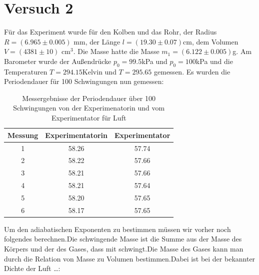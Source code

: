 \documentclass[bibliography=totocnumbered]{scrartcl}
\begin{document}
	\section{Versuch 2}
	Für das Experiment wurde für den Kolben und das Rohr, der Radius $ R=(6.965\pm 0.005) $ mm, der Länge $ l=(19.30\pm 0.07) $cm,
	 dem Volumen $ V=(4381\pm 10) $ cm$ ^{3} $.
	Die Masse hatte die Masse $ m_{1}=(6.122\pm0.005) $g.
	Am Barometer wurde der Außendrücke $ p_{0}=99.5 $kPa und $ p_{0}=100 $kPa  und die Temperaturen $ T=294.15 $Kelvin und $ T=295.65 $ gemessen.
	Es wurden die Periodendauer für 100 Schwingungen nun gemessen:
	\begin{table}[ht!]
		\centering
		\caption{Messergebnisse der Periodendauer über 100 Schwingungen von der Experimenatorin und vom Experimentator für Luft}
		\begin{tabular}{|c|c|c|}
			\hline
			Messung & Experimentatorin & Experimentator \\
			\hline
			1 & 58.26 & 57.74 \\
			\hline
			2 & 58.22 & 57.66 \\
			\hline
			3 & 58.21 & 57.66 \\
			\hline
			4 & 58.21 & 57.64 \\
			\hline
			5 & 58.20 & 57.65 \\
			\hline
			6 & 58.17 & 57.65 \\
			\hline
		\end{tabular}
		\label{tab: M.ergebnisse A2 T100}
	\end{table}
	Um den adiabatischen Exponenten zu bestimmen müssen wir vorher noch folgendes berechnen.Die schwingende Masse ist die Summe aus der Masse des Körpers und der des Gases, dass mit schwingt.Die Masse des Gases kann man durch die Relation von Masse zu Volumen bestimmen.Dabei ist bei der bekannter Dichte der Luft …:
	
\end{document}
